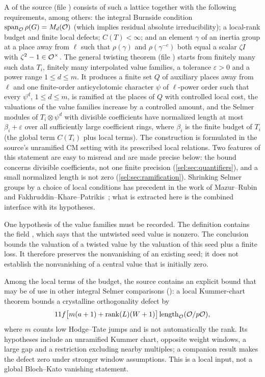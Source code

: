 A  of the source (file
) consists of such a lattice
together with the following requirements, among others: the integral
Burnside condition $\operatorname{span}_{\mathcal{O}}\rho(G)=M_d(\mathcal{O})$ (which implies
residual absolute irreducibility); a local-rank budget and finite local
defects; $C(T)<\infty$; and an element $\gamma$ of an inertia group at a
place away from $\ell$ such that $\rho(\gamma)$ and $\rho(\gamma^{-c})$ both
equal a scalar $\zeta I$ with $\zeta^2-1\in\mathcal{O}^\times$. The general twisting
theorem  (file
) starts from finitely many
such data $T_i$, finitely many interpolated value families, a tolerance
$\varepsilon>0$ and a power range $1\le d\le m$. It produces a finite set
$Q$ of auxiliary places away from $\ell$ and one finite-order
anticyclotomic character $\psi$ of $\ell$-power order such that every
$\psi^d$, $1\le d\le m$, is ramified at the places of $Q$ with controlled
local cost, the valuations of the value families increase by a controlled amount, and the
Selmer modules of $T_i\otimes\psi^d$ with divisible coefficients have
normalized length at most $\beta_i+\varepsilon$ over all sufficiently large
coefficient rings, where $\beta_i$ is the finite budget of $T_i$ (the
global term $C(T_i)$ plus local terms). The construction is formulated in
the source's unramified CM setting with its prescribed local relations.
Two features of this statement are easy to misread and are made precise
below: the bound concerns divisible coefficients, not one finite precision
(\cref{sel:sec:quantifiers}), and a small normalized length is not zero
(\cref{sel:sec:ramification}). Shrinking Selmer groups by a choice of local
conditions has precedent in the work of Mazur--Rubin and
Fakhruddin--Khare--Patrikis~\cite{Mazur2018Diophantine,Fakhruddin2021Relative};
what is extracted here is the combined interface with its hypotheses.

One hypothesis of the value families must be recorded. The definition
 contains the field , which says that
the untwisted seed value is nonzero. The conclusion bounds the valuation of
a twisted value by the valuation of this seed plus a finite loss. It
therefore preserves the nonvanishing of an existing seed; it does not
establish the nonvanishing of a central value that is initially zero.

Among the local terms of the budget, the source contains an explicit bound
that may be of use in other integral Selmer comparisons
(): a local Kummer-chart theorem bounds a
crystalline orthogonality defect by
\[
 11f\bigl[m(a+1)+\operatorname{rank}(L)(W+1)\bigr]\operatorname{length}_{\mathcal{O}}(\mathcal{O}/p\mathcal{O}),
\]
where $m$ counts low Hodge--Tate jumps and is not automatically the rank.
Its hypotheses include an unramified Kummer chart, opposite weight windows,
a large gap and a restriction excluding nearby multiples; a companion
result makes the defect zero under stronger window assumptions. This is a
local input, not a global Bloch--Kato vanishing statement.

